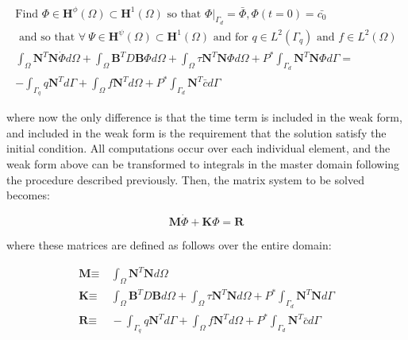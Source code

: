 \documentclass[10pt]{article}
\begin{document}
\begin{tcolorbox}
\begin{equation}
\label{eq:WeakFormPenalty}
\begin{aligned}
\text{Find }\Phi\in \textbf{H}^\phi(\Omega)\subset \textbf{H}^1(\Omega) \text{ so that } \Phi|_{\Gamma_d}=\bar{\Phi}, \Phi(t=0)=\bar{c_0}\\
\text{ and so that }\forall\ \Psi \in \textbf{H}^\psi(\Omega)\subset \textbf{H}^1(\Omega)\text{ and for }q\in L^2(\Gamma_q)\text{ and }f\in L^2(\Omega)\\
\int_{\Omega}\textbf{N}^T\textbf{N}\dot{\Phi}d\Omega+\int_{\Omega}\textbf{B}^TD\textbf{B}\Phi d\Omega+\int_{\Omega}\tau \textbf{N}^T\textbf{N}\Phi d\Omega+P^{*}\int_{\Gamma_d}\textbf{N}^T\textbf{N}\Phi d\Gamma=\quad\\
-\int_{\Gamma_q}q\textbf{N}^Td\Gamma+\int_{\Omega}f\textbf{N}^Td\Omega+P^{*}\int_{\Gamma_d}\textbf{N}^T\bar{c}d\Gamma
\end{aligned}
\end{equation}
\end{tcolorbox}

where now the only difference is that the time term is included in the weak form, and included in the weak form is the requirement that the solution satisfy the initial condition. All computations occur over each individual element, and the weak form above can be transformed to integrals in the master domain following the procedure described previously. Then, the matrix system to be solved becomes:

\begin{equation}
\textbf{M}\dot{\Phi}+\textbf{K}\Phi=\textbf{R}
\end{equation}

where these matrices are defined as follows over the entire domain:

\begin{equation}
\begin{aligned}
\textbf{M}\equiv&\ \int_{\Omega}\textbf{N}^T\textbf{N}d\Omega\\
\textbf{K}\equiv&\ \int_{\Omega}\textbf{B}^TD\textbf{B} d\Omega+\int_{\Omega}\tau \textbf{N}^T\textbf{N} d\Omega+P^{*}\int_{\Gamma_d}\textbf{N}^T\textbf{N} d\Gamma\\
\textbf{R}\equiv&\ -\int_{\Gamma_q}q\textbf{N}^Td\Gamma+\int_{\Omega}f\textbf{N}^Td\Omega+P^{*}\int_{\Gamma_d}\textbf{N}^T\bar{c}d\Gamma\\
\end{aligned}
\end{equation}
\end{document}
